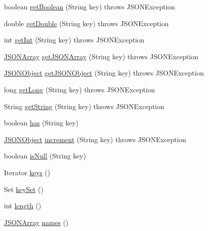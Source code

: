 \begin{DoxyCompactItemize}
\item 
boolean \hyperlink{classorg_1_1json_1_1_j_s_o_n_object_ab40aab8de47233591ac4ad9d1b31adc0}{get\-Boolean} (String key)  throws J\-S\-O\-N\-Exception 
\item 
double \hyperlink{classorg_1_1json_1_1_j_s_o_n_object_abeec5fe03f3a260b7ec7a2b3076ca5ec}{get\-Double} (String key)  throws J\-S\-O\-N\-Exception 
\item 
int \hyperlink{classorg_1_1json_1_1_j_s_o_n_object_a3756c60c7c7bfecbdde3c3b5b1bcf385}{get\-Int} (String key)  throws J\-S\-O\-N\-Exception 
\item 
\hyperlink{classorg_1_1json_1_1_j_s_o_n_array}{J\-S\-O\-N\-Array} \hyperlink{classorg_1_1json_1_1_j_s_o_n_object_a884ee44fe958e9ea737d6c5e1180cb62}{get\-J\-S\-O\-N\-Array} (String key)  throws J\-S\-O\-N\-Exception 
\item 
\hyperlink{classorg_1_1json_1_1_j_s_o_n_object}{J\-S\-O\-N\-Object} \hyperlink{classorg_1_1json_1_1_j_s_o_n_object_a6011679cb15a3aac5944bb4a8af9f7fb}{get\-J\-S\-O\-N\-Object} (String key)  throws J\-S\-O\-N\-Exception 
\item 
long \hyperlink{classorg_1_1json_1_1_j_s_o_n_object_a3547552ed2f4c5d415eab8202e8d6158}{get\-Long} (String key)  throws J\-S\-O\-N\-Exception 
\item 
String \hyperlink{classorg_1_1json_1_1_j_s_o_n_object_a7140df2bac96f4d75a3f338ed16d1212}{get\-String} (String key)  throws J\-S\-O\-N\-Exception 
\item 
boolean \hyperlink{classorg_1_1json_1_1_j_s_o_n_object_aa3d594c3e7a5b6d9b89aa6cda03bac28}{has} (String key)
\item 
\hyperlink{classorg_1_1json_1_1_j_s_o_n_object}{J\-S\-O\-N\-Object} \hyperlink{classorg_1_1json_1_1_j_s_o_n_object_a4c808cfee4389ecf543781feaa1b950c}{increment} (String key)  throws J\-S\-O\-N\-Exception 
\item 
boolean \hyperlink{classorg_1_1json_1_1_j_s_o_n_object_a8de41c5807522df5a7b888a0ffd6b69b}{is\-Null} (String key)
\item 
Iterator \hyperlink{classorg_1_1json_1_1_j_s_o_n_object_a1909c454712287d3a7c988beaa0613ff}{keys} ()
\item 
Set \hyperlink{classorg_1_1json_1_1_j_s_o_n_object_a60a1757ce5acba415364ba982f7e48b2}{key\-Set} ()
\item 
int \hyperlink{classorg_1_1json_1_1_j_s_o_n_object_a2c47910737728e063a8395d3a9152d42}{length} ()
\item 
\hyperlink{classorg_1_1json_1_1_j_s_o_n_array}{J\-S\-O\-N\-Array} \hyperlink{classorg_1_1json_1_1_j_s_o_n_object_a02e83de70e290231527d1760c4dd30fc}{names} ()

\end{DoxyCompactItemize}
